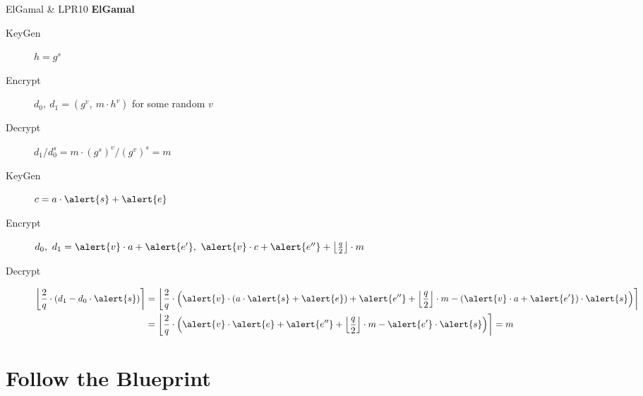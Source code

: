 \documentclass[xcolor=table,10pt,aspectratio=169]{beamer}
\begin{document}
\begin{frame}[label={sec:org3a59f2e}]{ElGamal \& LPR10}
\textbf{ElGamal}

\begin{description}
\item[{KeyGen}] \(h = g^{s}\)
\item[{Encrypt}] \(d_{0},\ d_{1} = \left({g^{v},\  m \cdot h^{v}}\right)\) for some random \(v\)
\item[{Decrypt}] \(d_{1} / d_{0}^{s} = m \cdot (g^{s})^{v} / (g^{v})^{s} = m\)
\end{description}

\textbf{\cite{EC:LyuPeiReg10}}

\begin{description}
\item[{KeyGen}] \(c = a \cdot \alert{s} + \alert{e}\)
\item[{Encrypt}] \(d_{0}, \ d_{1} = \alert{v} \cdot a + \alert{e'},\ \alert{v} \cdot c + \alert{e''} +\left\lfloor \frac{q}{2} \right\rfloor  \cdot m\)
\item[{Decrypt}] \begin{align*}
\left\lfloor \frac{2}{q} \cdot \left(d_{1} - d_{0} \cdot \alert{s}\right) \right\rceil &= \left\lfloor \frac{2}{q} \cdot \left({\alert{v} \cdot (a \cdot \alert{s} + \alert{e}) + \alert{e''} + \left\lfloor \frac{q}{2} \right\rfloor \cdot m - \left(\alert{v} \cdot a + \alert{e'}\right) \cdot \alert{s}}\right) \right\rceil\\
&= \left\lfloor \frac{2}{q} \cdot \left({\alert{v} \cdot \alert{e} + \alert{e''} + \left\lfloor \frac{q}{2} \right\rfloor  \cdot m - \alert{e'} \cdot \alert{s}}\right) \right\rceil = m\\
\end{align*}
\end{description}
\end{frame}
\section{Follow the Blueprint}
\label{sec:org9a793ee}
\end{document}
